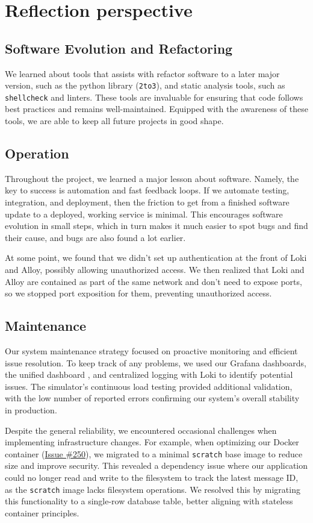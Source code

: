 \section{Reflection perspective} \label{rp}
\subsection{Software Evolution and Refactoring}
We learned about tools that assists with refactor software to a later major version, such as the python library (\texttt{2to3}), and static analysis tools, such as \texttt{shellcheck} and linters. These tools are invaluable for ensuring that code follows best practices and remains well-maintained. Equipped with the awareness of these tools, we are able to keep all future projects in good shape. 


\subsection{Operation} %
Throughout the project, we learned a major lesson about software. Namely, the key to success is automation and fast feedback loops. If we automate testing, integration, and deployment, then the friction to get from a finished software update to a deployed, working service is minimal. This encourages software evolution in small steps, which in turn makes it much easier to spot bugs and find their cause, and bugs are also found a lot earlier.

At some point, we found that we didn’t set up authentication at the front of Loki
and Alloy, possibly allowing unauthorized access. We then realized 
that Loki and Alloy are contained as part of the same network and don’t need to expose ports,
so we stopped port exposition for them, preventing unauthorized access.

\subsection{Maintenance} 
Our system maintenance strategy focused on proactive monitoring and efficient issue resolution. To keep track of any problems, we used our Grafana dashboards, the unified dashboard \parencite["Status for All Groups"]{dashboard}, and centralized logging with Loki to identify potential issues. The simulator's continuous load testing provided additional validation, with the low number of reported errors confirming our system's overall stability in production.

Despite the general reliability, we encountered occasional challenges when implementing infrastructure changes. For example, when optimizing our Docker container (\href{https://github.com/devops-q/devops/issues/250}{Issue \#250}), we migrated to a minimal \texttt{scratch} base image to reduce size and improve security. This revealed a dependency issue where our application could no longer read and write to the filesystem to track the latest message ID, as the \texttt{scratch} image lacks filesystem operations. We resolved this by migrating this functionality to a single-row database table, better aligning with stateless container principles.

